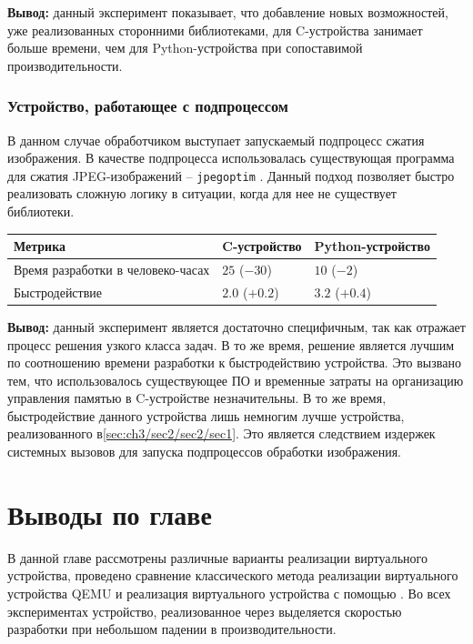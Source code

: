 \textbf{Вывод:} данный эксперимент показывает, что добавление новых возможностей,
уже реализованных сторонними библиотеками, для C-устройства занимает больше времени,
чем для Python-устройства при сопоставимой производительности.

\subsubsection{Устройство, работающее с подпроцессом}\label{sec:ch3/sec2/sec2/sec2}

В данном случае обработчиком выступает запускаемый подпроцесс сжатия
изображения. В качестве подпроцесса использовалась существующая программа
для сжатия JPEG-изображений -- \texttt{jpegoptim} \cite{jpegoptim}.
Данный подход позволяет быстро реализовать сложную логику в ситуации, когда
для нее не существует библиотеки.

\begin{longtable}{| p{5cm} | p{5cm} | p{5cm} |}
    \hline
    Метрика & C-устройство & Python-устройство \\
    \hline
        Время разработки в человеко-часах &
        $25$ ($-30$) &
        $10$ ($-2$) \\
    \hline
        Быстродействие &
        $2.0$ ($+0.2$)  &
        $3.2$ ($+0.4$)  \\
    \hline
\end{longtable}

\textbf{Вывод:} данный эксперимент является достаточно специфичным, так как отражает процесс
решения узкого класса задач. В то же время, решение является лучшим по соотношению
времени разработки к быстродействию устройства.
Это вызвано тем, что использовалось существующее ПО и временные затраты на
организацию управления памятью в C-устройстве незначительны.
В то же время, быстродействие данного устройства лишь немногим лучше устройства,
реализованного в\cref{sec:ch3/sec2/sec2/sec1}. Это является следствием издержек
системных вызовов для запуска подпроцессов обработки изображения.


\section*{Выводы по главе}\label{sec:ch3/sec3}

В данной главе рассмотрены различные варианты реализации виртуального
устройства, проведено сравнение классического метода реализации виртуального устройства
QEMU и реализация виртуального устройства с помощью {\mylanguage}.
Во всех экспериментах устройство, реализованное через {\mylanguage} выделяется
скоростью разработки при небольшом падении в производительности.

